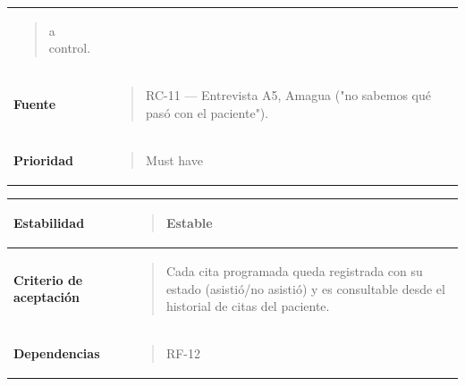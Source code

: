 \documentclass[
]{article}
\newcounter{none} %
\begin{document}
{\begin{longtable}[]{@{}
  >{\raggedright\arraybackslash}p{}
  >{\raggedright\arraybackslash}p{}@{}}
\begin{minipage}[t]{\linewidth}
\begin{quote}
a control.
\end{quote}
\end{minipage} \\
\textbf{Fuente} & \begin{minipage}[t]{\linewidth}\raggedright
\begin{quote}
RC-11 --- Entrevista A5, Amagua ("no sabemos qué pasó con el paciente").
\end{quote}
\end{minipage} \\
\textbf{Prioridad} & \begin{minipage}[t]{\linewidth}\raggedright
\begin{quote}
Must have
\end{quote}
\end{minipage} \\
\end{longtable}
}

{\def\LTcaptype{none} %
\begin{longtable}[]{@{}
  >{\raggedright\arraybackslash}p{}
  >{\raggedright\arraybackslash}p{}@{}}
\toprule\noalign{}
\begin{minipage}[b]{\linewidth}\raggedright
\textbf{Estabilidad}
\end{minipage} & \begin{minipage}[b]{\linewidth}\raggedright
\begin{quote}
Estable
\end{quote}
\end{minipage} \\
\midrule\noalign{}
\endhead
\bottomrule\noalign{}
\endlastfoot
\textbf{Criterio de aceptación} &
\begin{minipage}[t]{\linewidth}\raggedright
\begin{quote}
Cada cita programada queda registrada con su estado (asistió/no asistió)
y es consultable desde el historial de citas del paciente.
\end{quote}
\end{minipage} \\
\textbf{Dependencias} & \begin{minipage}[t]{\linewidth}\raggedright
\begin{quote}
RF-12
\end{quote}
\end{minipage} \\
\end{longtable}
}
\end{document}
